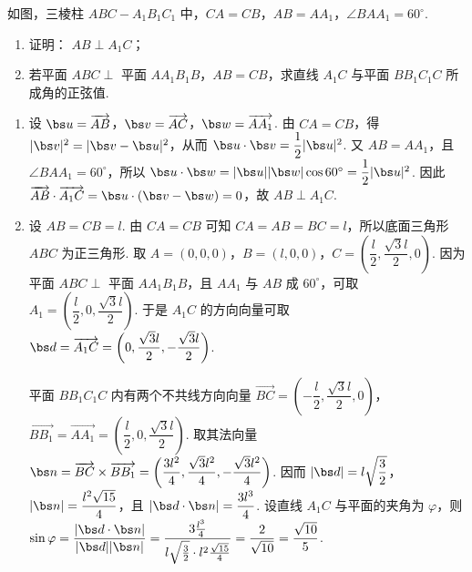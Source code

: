 \begin{problem}
如图，三棱柱 \(ABC - A_{1}B_{1}C_{1}\) 中，\(CA = CB\)，\(AB = AA_{1}\)，\(\angle BAA_{1} = 60^{\circ}\).

\begin{enumerate}
\item 证明： \(AB \perp A_{1}C\)；
\item 若平面 \( ABC \perp \) 平面 \(AA_{1}B_{1}B\)，\( AB = CB \)，求直线 \(A_{1}C\) 与平面 \(BB_{1}C_{1}C\) 所成角的正弦值.
\end{enumerate}

\begin{center}
\end{center}
\end{problem}

\begin{solution}
\begin{enumerate}
\item 设 \(\bs u=\overrightarrow{AB}\)，\(\bs v=\overrightarrow{AC}\)，\(\bs w=\overrightarrow{AA_1}\). 由 \(CA=CB\)，得
\(\lvert\bs v\rvert^2=\lvert\bs v-\bs u\rvert^2\)，从而 \(\bs u\cdot\bs v=\dfrac12\lvert\bs u\rvert^2\). 又 \(AB=AA_1\)，且 \(\angle BAA_1=60^\circ\)，所以
\(\bs u\cdot\bs w=\lvert\bs u\rvert\lvert\bs w\rvert\cos60^\circ=\dfrac12\lvert\bs u\rvert^2\). 因此
\(\overrightarrow{AB}\cdot\overrightarrow{A_1C}=\bs u\cdot(\bs v-\bs w)=0\)，故 \(AB\perp A_1C\).

\item 设 \(AB=CB=l\). 由 \(CA=CB\) 可知 \(CA=AB=BC=l\)，所以底面三角形 \(ABC\) 为正三角形. 取 \(A=(0,0,0)\)，\(B=(l,0,0)\)，\(C=\left(\dfrac l2,\dfrac{\sqrt3l}{2},0\right)\). 因为平面 \(ABC\perp\) 平面 \(AA_1B_1B\)，且 \(AA_1\) 与 \(AB\) 成 \(60^\circ\)，可取
\(A_1=\left(\dfrac l2,0,\dfrac{\sqrt3l}{2}\right)\). 于是 \(A_1C\) 的方向向量可取
\(\bs d=\overrightarrow{A_1C}=\left(0,\dfrac{\sqrt3l}{2},-\dfrac{\sqrt3l}{2}\right)\).

平面 \(BB_1C_1C\) 内有两个不共线方向向量
\(\overrightarrow{BC}=\left(-\dfrac l2,\dfrac{\sqrt3l}{2},0\right)\)，\(\overrightarrow{BB_1}=\overrightarrow{AA_1}=\left(\dfrac l2,0,\dfrac{\sqrt3l}{2}\right)\). 取其法向量
\(\bs n=\overrightarrow{BC}\times\overrightarrow{BB_1}=\left(\dfrac{3l^2}{4},\dfrac{\sqrt3l^2}{4},-\dfrac{\sqrt3l^2}{4}\right)\). 因而
\(\lvert\bs d\rvert=l\sqrt{\dfrac32}\)，\(\lvert\bs n\rvert=\dfrac{l^2\sqrt{15}}4\)，且 \(\lvert\bs d\cdot\bs n\rvert=\dfrac{3l^3}{4}\). 设直线 \(A_1C\) 与平面的夹角为 \(\varphi\)，则
\(\sin\varphi=\dfrac{\lvert\bs d\cdot\bs n\rvert}{\lvert\bs d\rvert\lvert\bs n\rvert}=\dfrac{3\frac{l^3}{4}}{l\sqrt{\frac{3}{2}}\cdot l^2\frac{\sqrt{15}}{4}}=\dfrac{2}{\sqrt{10}}=\dfrac{\sqrt{10}}5\).
\end{enumerate}
\end{solution}

